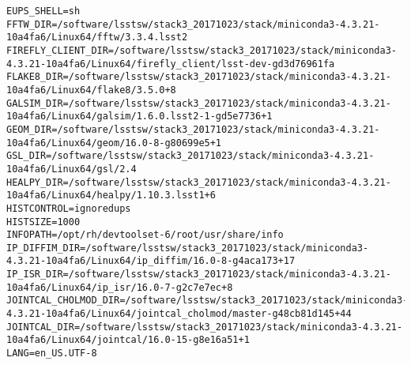 \begin{verbatim}
EUPS_SHELL=sh
FFTW_DIR=/software/lsstsw/stack3_20171023/stack/miniconda3-4.3.21-10a4fa6/Linux64/fftw/3.3.4.lsst2
FIREFLY_CLIENT_DIR=/software/lsstsw/stack3_20171023/stack/miniconda3-4.3.21-10a4fa6/Linux64/firefly_client/lsst-dev-gd3d76961fa
FLAKE8_DIR=/software/lsstsw/stack3_20171023/stack/miniconda3-4.3.21-10a4fa6/Linux64/flake8/3.5.0+8
GALSIM_DIR=/software/lsstsw/stack3_20171023/stack/miniconda3-4.3.21-10a4fa6/Linux64/galsim/1.6.0.lsst2-1-gd5e7736+1
GEOM_DIR=/software/lsstsw/stack3_20171023/stack/miniconda3-4.3.21-10a4fa6/Linux64/geom/16.0-8-g80699e5+1
GSL_DIR=/software/lsstsw/stack3_20171023/stack/miniconda3-4.3.21-10a4fa6/Linux64/gsl/2.4
HEALPY_DIR=/software/lsstsw/stack3_20171023/stack/miniconda3-4.3.21-10a4fa6/Linux64/healpy/1.10.3.lsst1+6
HISTCONTROL=ignoredups
HISTSIZE=1000
INFOPATH=/opt/rh/devtoolset-6/root/usr/share/info
IP_DIFFIM_DIR=/software/lsstsw/stack3_20171023/stack/miniconda3-4.3.21-10a4fa6/Linux64/ip_diffim/16.0-8-g4aca173+17
IP_ISR_DIR=/software/lsstsw/stack3_20171023/stack/miniconda3-4.3.21-10a4fa6/Linux64/ip_isr/16.0-7-g2c7e7ec+8
JOINTCAL_CHOLMOD_DIR=/software/lsstsw/stack3_20171023/stack/miniconda3-4.3.21-10a4fa6/Linux64/jointcal_cholmod/master-g48cb81d145+44
JOINTCAL_DIR=/software/lsstsw/stack3_20171023/stack/miniconda3-4.3.21-10a4fa6/Linux64/jointcal/16.0-15-g8e16a51+1
LANG=en_US.UTF-8

\end{verbatim}
